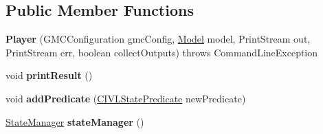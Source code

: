 \subsection*{Public Member Functions}
\begin{DoxyCompactItemize}
\item 
\hypertarget{classedu_1_1udel_1_1cis_1_1vsl_1_1civl_1_1run_1_1IF_1_1Player_a90e4d9b41b3b260974a6b945b4d30a09}{}{\bfseries Player} (G\+M\+C\+Configuration gmc\+Config, \hyperlink{interfaceedu_1_1udel_1_1cis_1_1vsl_1_1civl_1_1model_1_1IF_1_1Model}{Model} model, Print\+Stream out, Print\+Stream err, boolean collect\+Outputs)  throws Command\+Line\+Exception \label{classedu_1_1udel_1_1cis_1_1vsl_1_1civl_1_1run_1_1IF_1_1Player_a90e4d9b41b3b260974a6b945b4d30a09}

\item 
\hypertarget{classedu_1_1udel_1_1cis_1_1vsl_1_1civl_1_1run_1_1IF_1_1Player_ab421800fe77e1b79bf30c43908d5cba3}{}void {\bfseries print\+Result} ()\label{classedu_1_1udel_1_1cis_1_1vsl_1_1civl_1_1run_1_1IF_1_1Player_ab421800fe77e1b79bf30c43908d5cba3}

\item 
\hypertarget{classedu_1_1udel_1_1cis_1_1vsl_1_1civl_1_1run_1_1IF_1_1Player_a03223e56e3958f0b52cdb447baf0574c}{}void {\bfseries add\+Predicate} (\hyperlink{interfaceedu_1_1udel_1_1cis_1_1vsl_1_1civl_1_1predicate_1_1IF_1_1CIVLStatePredicate}{C\+I\+V\+L\+State\+Predicate} new\+Predicate)\label{classedu_1_1udel_1_1cis_1_1vsl_1_1civl_1_1run_1_1IF_1_1Player_a03223e56e3958f0b52cdb447baf0574c}

\item 
\hypertarget{classedu_1_1udel_1_1cis_1_1vsl_1_1civl_1_1run_1_1IF_1_1Player_aab3786f033243d48e0f2615f02af75d0}{}\hyperlink{interfaceedu_1_1udel_1_1cis_1_1vsl_1_1civl_1_1kripke_1_1IF_1_1StateManager}{State\+Manager} {\bfseries state\+Manager} ()\label{classedu_1_1udel_1_1cis_1_1vsl_1_1civl_1_1run_1_1IF_1_1Player_aab3786f033243d48e0f2615f02af75d0}

\end{DoxyCompactItemize}
